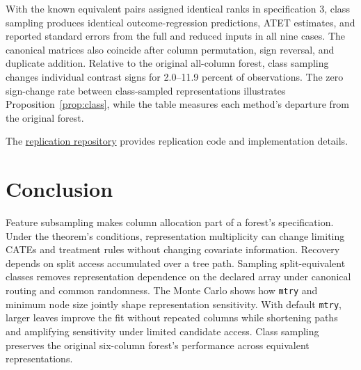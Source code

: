 \documentclass[12pt]{article}
\begin{document}
With the known equivalent pairs assigned identical ranks in specification 3, class sampling produces identical outcome-regression predictions, ATET estimates, and reported standard errors from the full and reduced inputs in all nine cases. The canonical matrices also coincide after column permutation, sign reversal, and duplicate addition. Relative to the original all-column forest, class sampling changes individual contrast signs for 2.0--11.9 percent of observations. The zero sign-change rate between class-sampled representations illustrates Proposition~\ref{prop:class}, while the table measures each method's departure from the original forest.

The \href{https://github.com/YiNiu-bot/representation-multiplicity-causal-forests}{replication repository} provides replication code and implementation details.

\FloatBarrier

\section{Conclusion}\label{sec:conclusion}

Feature subsampling makes column allocation part of a forest's specification. Under the theorem's conditions, representation multiplicity can change limiting CATEs and treatment rules without changing covariate information. Recovery depends on split access accumulated over a tree path. Sampling split-equivalent classes removes representation dependence on the declared array under canonical routing and common randomness. The Monte Carlo shows how \texttt{mtry} and minimum node size jointly shape representation sensitivity. With default \texttt{mtry}, larger leaves improve the fit without repeated columns while shortening paths and amplifying sensitivity under limited candidate access. Class sampling preserves the original six-column forest's performance across equivalent representations.
\end{document}

